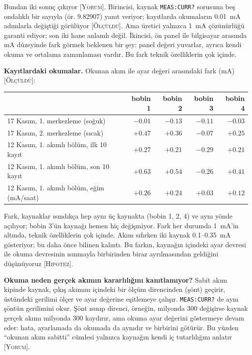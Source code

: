 \documentclass[11pt,a4paper]{article}
\newcommand{\kod}[1]{\texttt{#1}}
\newcommand{\olc}{\textsc{[Ölçüldü]}}
\newcommand{\yor}{\textsc{[Yorum]}}
\newcommand{\hip}{\textsc{[Hipotez]}}
\begin{document}
Bundan iki sonuç çıkıyor \yor. Birincisi, kaynak \kod{MEAS:CURR?} sorusuna beş ondalıklı bir sayıyla
(ör. 9.82907) yanıt veriyor; kayıtlarda okumaların 0.01~mA adımlarla değiştiği görülüyor \olc. Ama üretici
yalnızca 1~mA çözünürlüğü garanti ediyor; son iki hane anlamlı değil. İkincisi, ön panel ile bilgisayar
arasında mA düzeyinde fark görmek beklenen bir şey: panel değeri yuvarlar, ayrıca kendi okuma ve ortalama
zamanlaması vardır. Bu fark teknik özelliklerin çok içinde.

\textbf{Kayıtlardaki okumalar.} Okunan akım ile ayar değeri arasındaki fark (mA) \olc:
\begin{center}\small
\begin{tabular}{lrrrr}
\toprule
 & bobin 1 & bobin 2 & bobin 3 & bobin 4 \\
\midrule
17 Kasım, 1. merkezleme (soğuk) & $-0.01$ & $-0.13$ & $-0.11$ & $-0.03$ \\
17 Kasım, 2. merkezleme (sıcak) & $+0.47$ & $+0.36$ & $-0.07$ & $+0.25$ \\
12 Kasım, 1. akımlı bölüm, ilk 10 kayıt & $+0.27$ & $+0.21$ & $-0.29$ & $+0.21$ \\
12 Kasım, 1. akımlı bölüm, son 10 kayıt & $+0.63$ & $+0.54$ & $-0.26$ & $+0.41$ \\
12 Kasım, 1. akımlı bölüm, eğim (mA/saat) & $+0.26$ & $+0.24$ & $+0.03$ & $+0.12$ \\
\bottomrule
\end{tabular}
\end{center}
Fark, kaynaklar ısındıkça hep aynı üç kaynakta (bobin 1, 2, 4) ve aynı yönde açılıyor; bobin 3'ün kaynağı
hemen hiç değişmiyor. Fark her durumda 1~mA'in altında, teknik özelliklerin çok içinde. Akım sıfırken iki kaynak
0.1--0.35~mA gösteriyor; bu daha önce bilinen kalıntı. Bu farkın, kaynağın içindeki ayar devresi ile okuma
devresinin ısınmayla birbirinden biraz ayrılmasından geldiğini düşünüyoruz \hip.

\textbf{Okuma neden gerçek akımın kararlılığını kanıtlamıyor?} Sabit akım kipinde kaynak, çıkış akımını
içindeki bir ölçüm direncinden (şönt) geçirir, üstündeki gerilimi ölçer ve ayar değerine eşitlemeye çalışır.
\kod{MEAS:CURR?} de aynı şöntün gerilimini okur. Şönt ısınıp direnci, örneğin, milyonda 300 değişirse kaynak
gerçek akımı milyonda 300 kaydırır, ama okuma ayar değerini göstermeye devam eder: hata, ayarlamada da
okumada da aynıdır ve birbirini götürür. Bu yüzden ``okunan akım sabitti'' cümlesi yalnızca kaynağın kendi
iç tutarlılığını anlatır \yor.
\end{document}
